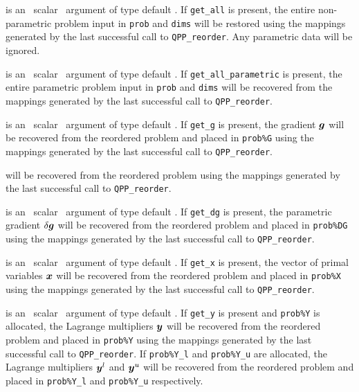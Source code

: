 \documentclass{galahad}
\newcommand{\packagename}{QPP}
\begin{document}
\begin{description}
is an \optional\ scalar \intentin\ argument of type default \logical. 
If {\tt get\_all} is present, the entire non-parametric problem 
input in {\tt prob} and {\tt dims} will be restored using the 
mappings generated by the last successful call to {\tt \packagename\_reorder}. 
Any parametric data will be ignored.

is an \optional\ scalar \intentin\ argument of type default \logical. 
If {\tt get\_all\_parametric} is present, the entire parametric problem 
input in {\tt prob} and {\tt dims} will be recovered from the 
mappings generated by the last successful call to {\tt \packagename\_reorder}. 
 
is an \optional\ scalar \intentin\ argument of type default \logical. 
If {\tt get\_g} is present, the gradient ${\bm{g}}$
will be recovered from  the reordered problem and placed in {\tt prob\%G} 
using the mappings generated by the last successful call to 
{\tt \packagename\_reorder}. 

will be recovered from  the reordered problem using the 
mappings generated by the last successful call to {\tt \packagename\_reorder}. 
 
is an \optional\ scalar \intentin\ argument of type default \logical. 
If {\tt get\_dg} is present, the parametric gradient $\delta {\bm{g}}$
will be recovered from  the reordered problem and placed in {\tt prob\%DG} 
using the mappings generated by the last successful call to 
{\tt \packagename\_reorder}. 
 
is an \optional\ scalar \intentin\ argument of type default \logical. 
If {\tt get\_x} is present, the vector of primal variables ${\bm{x}}$
will be recovered from  the reordered problem and placed in {\tt prob\%X} 
using the mappings generated by the last successful call to 
{\tt \packagename\_reorder}. 
 
is an \optional\ scalar \intentin\ argument of type default \logical. 
If {\tt get\_y} is present and {\tt prob\%Y} is allocated, 
the Lagrange multipliers 
${\bm{y}}$ will be recovered from  the reordered problem and placed in {\tt prob\%Y} 
using the mappings generated by the last successful call to 
{\tt \packagename\_reorder}. If {\tt prob\%Y\_l} and {\tt prob\%Y\_u} 
are allocated, the Lagrange multipliers 
${\bm{y}}^l$ and ${\bm{y}}^u$ will be recovered from  the reordered problem and 
placed in {\tt prob\%Y\_l} and {\tt prob\%Y\_u} respectively.
 

\end{description}
\end{document}
